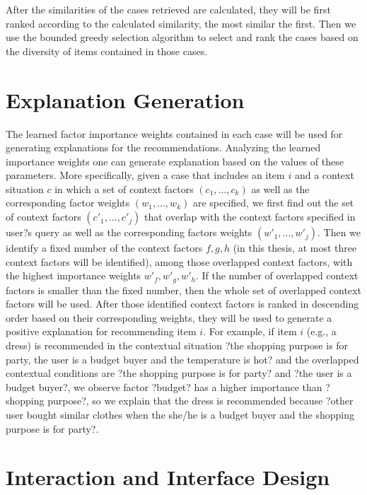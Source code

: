 After the similarities of the cases retrieved are calculated, they will be first ranked according to the calculated similarity, the most similar the first. Then we use the bounded greedy selection algorithm to select and rank the cases based on the diversity of items contained in those cases. 

\section{Explanation Generation} \label{sec:eg}

The learned factor importance weights contained in each case will be used for generating explanations for the recommendations.  Analyzing the learned importance weights one can generate explanation based on the values of these parameters. More specifically, given a case that includes an item $i$ and a context situation $c$ in which a set of context factors $(c_1, ..., c_k)$ as well as the corresponding factor weights $(w_1, ..., w_k)$ are specified, we first find out the set of context factors $(c\prime_1, ..., c\prime_j)$ that overlap with the context factors specified in user?s query as well as the corresponding factors weights $(w\prime_1, ..., w\prime_j)$. Then we identify a fixed number of the context factors $f, g, h$ (in this thesis, at most three context factors will be identified), among those overlapped context factors, with the highest importance weights $w\prime_f, w\prime_g, w\prime_h$. If the number of overlapped context factors is smaller than the fixed number, then the whole set of overlapped context factors will be used. After those identified context factors is ranked in descending order based on their corresponding weights, they will be used to generate a positive explanation for recommending item $i$. For example, if item $i$ (e.g., a dress) is recommended in the contextual situation ?the shopping purpose is for party, the user is a budget buyer and the temperature is hot? and the overlapped contextual conditions are ?the shopping purpose is for party? and ?the user is a budget buyer?, we observe factor ?budget? has a higher importance than ?shopping purpose?, so we explain that the dress is recommended because ?other user bought similar clothes when the she/he is a budget buyer and the shopping purpose is for party?.

\section{Interaction and Interface Design} \label{sec:eg}

